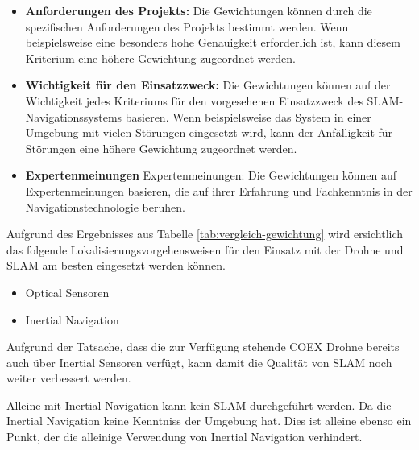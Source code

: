 \begin{itemize}
\item \textbf{Anforderungen des Projekts:} Die Gewichtungen können durch die spezifischen Anforderungen des Projekts bestimmt werden. Wenn beispielsweise eine besonders hohe Genauigkeit erforderlich ist, kann diesem Kriterium eine höhere Gewichtung zugeordnet werden.

\item \textbf{Wichtigkeit für den Einsatzzweck:} Die Gewichtungen können auf der Wichtigkeit jedes Kriteriums für den vorgesehenen Einsatzzweck des \ac{SLAM}-Navigationssystems basieren. Wenn beispielsweise das System in einer Umgebung mit vielen Störungen eingesetzt wird, kann der Anfälligkeit für Störungen eine höhere Gewichtung zugeordnet werden.
\item \textbf{Expertenmeinungen} Expertenmeinungen: Die Gewichtungen können auf Expertenmeinungen basieren, die auf ihrer Erfahrung und Fachkenntnis in der Navigationstechnologie beruhen.
\end{itemize}

Aufgrund des Ergebnisses aus Tabelle \ref{tab:vergleich-gewichtung} wird ersichtlich das folgende Lokalisierungsvorgehensweisen für den Einsatz mit der Drohne und \ac{SLAM} am besten eingesetzt werden können.

\begin{itemize}
    \item Optical Sensoren
    \item Inertial Navigation
\end{itemize}

Aufgrund der Tatsache, dass die zur Verfügung stehende COEX Drohne bereits auch über Inertial Sensoren verfügt, kann damit die Qualität von \ac{SLAM} noch weiter verbessert werden.

Alleine mit Inertial Navigation kann kein \ac{SLAM} durchgeführt werden. Da die Inertial Navigation keine Kenntniss der Umgebung hat. Dies ist alleine ebenso ein Punkt, der die alleinige Verwendung von Inertial Navigation verhindert.


